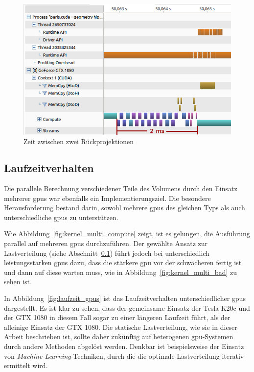 \begin{figure}
    \includegraphics[width=\linewidth]{img/timeline_compute3}
    \caption{Zeit zwischen zwei Rückprojektionen}
    \label{fig:kernel_wait}
\end{figure}

\subsection{Laufzeitverhalten}

Die parallele Berechnung verschiedener Teile des Volumens durch den Einsatz mehrerer \gls{gpu}s war ebenfalls ein
Implementierungsziel. Die besondere Herausforderung bestand darin, sowohl mehrere \gls{gpu}s des gleichen Typs als auch
unterschiedliche \gls{gpu}s zu unterstützen.

Wie Abbildung~\ref{fig:kernel_multi_compute} zeigt, ist es gelungen, die Ausführung parallel auf mehreren \gls{gpu}s
durchzuführen. Der gewählte Ansatz zur Lastverteilung (siehe Abschnitt~\ref{}) führt jedoch bei unterschiedlich
leistungsstarken \gls{gpu}s dazu, dass die stärkere \gls{gpu} vor der schwächeren fertig ist und dann auf diese warten
muss, wie in Abbildung~\ref{fig:kernel_multi_bad} zu sehen ist.

In Abbildung~\ref{fig:laufzeit_gpus} ist das Laufzeitverhalten unterschiedlicher \gls{gpu}s dargestellt. Es ist klar
zu sehen, dass der gemeinsame Einsatz der Tesla K20c und der GTX 1080 in diesem Fall sogar zu einer längeren Laufzeit
führt, als der alleinige Einsatz der GTX 1080. Die statische Lastverteilung, wie sie in dieser Arbeit beschrieben ist,
sollte daher zukünftig auf heterogenen \gls{gpu}-Systemen durch andere Methoden abgelöst werden. Denkbar ist
beispielsweise der Einsatz von \textit{Machine-Learning}-Techniken, durch die die optimale Lastverteilung iterativ
ermittelt wird.

